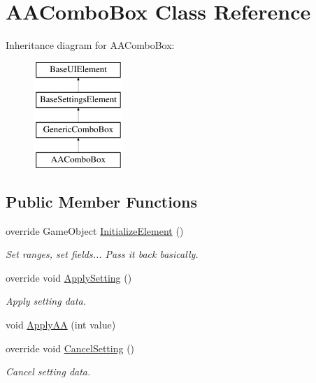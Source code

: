 \hypertarget{class_a_a_combo_box}{}\section{A\+A\+Combo\+Box Class Reference}
\label{class_a_a_combo_box}
Inheritance diagram for A\+A\+Combo\+Box\+:\begin{figure}[H]
\begin{center}
\leavevmode
\includegraphics[height=4.000000cm]{class_a_a_combo_box}
\end{center}
\end{figure}
\subsection*{Public Member Functions}
\begin{DoxyCompactItemize}
\item 
override Game\+Object \hyperlink{class_a_a_combo_box_a24e6de36b3019dd2a428837d6fab86b8}{Initialize\+Element} ()
\begin{DoxyCompactList}\small\item\em Set ranges, set fields... Pass it back basically. \end{DoxyCompactList}\item 
override void \hyperlink{class_a_a_combo_box_a449a6201d1e2c9e612b49bce29c1c151}{Apply\+Setting} ()
\begin{DoxyCompactList}\small\item\em Apply setting data. \end{DoxyCompactList}\item 
void \hyperlink{class_a_a_combo_box_a40b74d46ece795c636696452516f44ad}{Apply\+AA} (int value)
\item 
override void \hyperlink{class_a_a_combo_box_a1886a8ebd7ed57a6a5739469c6a88f65}{Cancel\+Setting} ()
\begin{DoxyCompactList}\small\item\em Cancel setting data. \end{DoxyCompactList}\end{DoxyCompactItemize}
